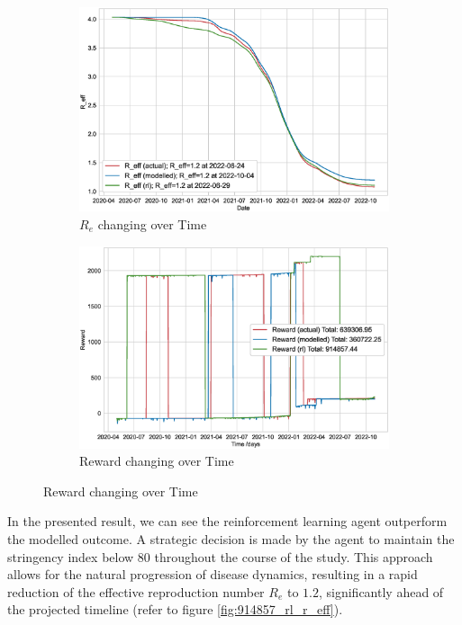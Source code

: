 \documentclass[tikz,fleqn,12pt]{wlscirep}
\begin{document}
\begin{figure}[htbp!]
  \begin{subfigure}[t]{0.48\textwidth}
    \centering
    \includegraphics[width=\linewidth]{images/914857/rl_r_eff.eps}
    \caption{$R_e$ changing over Time}
  \end{subfigure}
  \label{fig:914857_rl_r_eff}
  \hfill
  \begin{subfigure}[t]{0.48\textwidth}
    \centering
    \includegraphics[width=\linewidth]{images/914857/rl_reward.eps}
    \caption{Reward changing over Time}
  \end{subfigure}
  \label{fig:914857_rl_reward}
\end{figure}
In the presented result, we can see the reinforcement learning agent outperform the modelled outcome. A strategic decision is made by the agent to maintain the stringency index below 80 throughout the course of the study. This approach allows for the natural progression of disease dynamics, resulting in a rapid reduction of the effective reproduction number $R_e$ to $1.2$, significantly ahead of the projected timeline (refer to figure \cref{fig:914857_rl_r_eff}).
\end{document}
